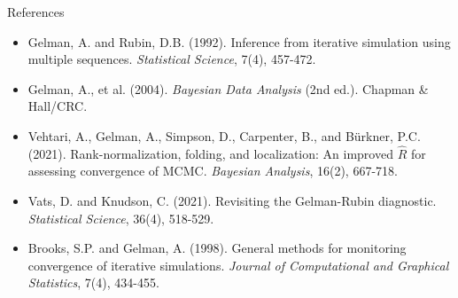 \begin{frame}{References}
	\small
	\begin{itemize}
		\item Gelman, A. and Rubin, D.B. (1992). Inference from iterative simulation using multiple sequences. \textit{Statistical Science}, 7(4), 457-472.

		\item Gelman, A., et al. (2004). \textit{Bayesian Data Analysis} (2nd ed.). Chapman \& Hall/CRC.

		\item Vehtari, A., Gelman, A., Simpson, D., Carpenter, B., and Bürkner, P.C. (2021). Rank-normalization, folding, and localization: An improved $\hat{R}$ for assessing convergence of MCMC. \textit{Bayesian Analysis}, 16(2), 667-718.

		\item Vats, D. and Knudson, C. (2021). Revisiting the Gelman-Rubin diagnostic. \textit{Statistical Science}, 36(4), 518-529.

		\item Brooks, S.P. and Gelman, A. (1998). General methods for monitoring convergence of iterative simulations. \textit{Journal of Computational and Graphical Statistics}, 7(4), 434-455.
	\end{itemize}
\end{frame}

